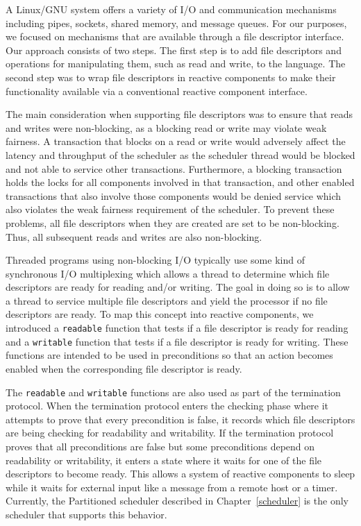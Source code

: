 A Linux/GNU system offers a variety of I/O and communication mechanisms including pipes, sockets, shared memory, and message queues.
For our purposes, we focused on mechanisms that are available through a file descriptor interface.
Our approach consists of two steps.
The first step is to add file descriptors and operations for manipulating them, such as read and write, to the \rcgo{} language.
The second step was to wrap file descriptors in reactive components to make their functionality available via a conventional reactive component interface.

The main consideration when supporting file descriptors was to ensure that reads and writes were non-blocking, as a blocking read or write may violate weak fairness.
A transaction that blocks on a read or write would adversely affect the latency and throughput of the scheduler as the scheduler thread would be blocked and not able to service other transactions.
Furthermore, a blocking transaction holds the locks for all components involved in that transaction, and other enabled transactions that also involve those components would be denied service which also violates the weak fairness requirement of the scheduler.
To prevent these problems, all file descriptors when they are created are set to be non-blocking.
Thus, all subsequent reads and writes are also non-blocking.

Threaded programs using non-blocking I/O typically use some kind of synchronous I/O multiplexing which allows a thread to determine which file descriptors are ready for reading and/or writing.
The goal in doing so is to allow a thread to service multiple file descriptors and yield the processor if no file descriptors are ready.
To map this concept into reactive components, we introduced a \verb+readable+ function that tests if a file descriptor is ready for reading and a \verb+writable+ function that tests if a file descriptor is ready for writing.
These functions are intended to be used in preconditions so that an action becomes enabled when the corresponding file descriptor is ready.

The \verb+readable+ and \verb+writable+ functions are also used as part of the termination protocol.
When the termination protocol enters the checking phase where it attempts to prove that every precondition is false, it records which file descriptors are being checking for readability and writability.
If the termination protocol proves that all preconditions are false but some preconditions depend on readability or writability, it enters a state where it waits for one of the file descriptors to become ready.
This allows a system of reactive components to sleep while it waits for external input like a message from a remote host or a timer.
Currently, the Partitioned scheduler described in Chapter~\ref{scheduler} is the only scheduler that supports this behavior.


